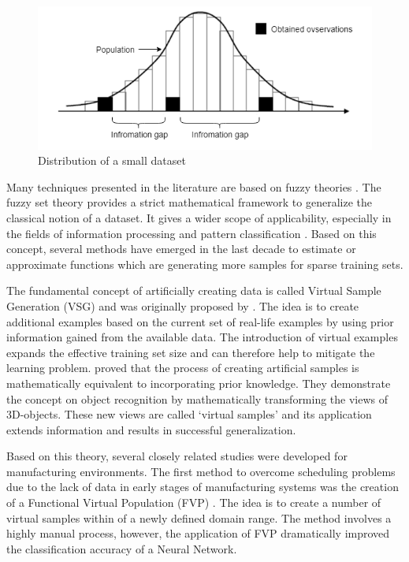 \documentclass[parskip=full]{scrartcl}
\begin{document}
\begin{figure}[H]
	\centering
	\includegraphics[width=0.6\linewidth]{"./resources/small_data_distribution"}
	\caption{Distribution of a small dataset \cite{Tsai.2015}}
	\label{fig:small-data-distribution}
\end{figure}

Many techniques presented in the literature are based on fuzzy theories
\cite{AbdulLateh.2017}. The fuzzy set theory provides a strict mathematical
framework to generalize the classical notion of a dataset. It gives a wider
scope of applicability, especially in the fields of information processing and
pattern classification \cite{Zimmermann.2010}. Based on this concept, several
methods have emerged in the last decade to estimate or approximate functions
which are generating more samples for sparse training sets.

The fundamental concept of artificially creating data is called Virtual Sample 
Generation (VSG) and was originally proposed by \cite{Niyogi.1998}. The idea is 
to create additional examples based on the current set of real-life examples by 
using prior information gained from the available data. The introduction of 
virtual examples expands the effective training set size and can therefore help 
to mitigate the learning problem. \cite{Niyogi.1998} proved that the process of 
creating artificial samples is mathematically equivalent to incorporating prior 
knowledge. They demonstrate the concept on object recognition by mathematically 
transforming the views of 3D-objects. These new views are called ‘virtual 
samples’ and its application extends information and results in successful 
generalization. 

Based on this theory, several closely related studies were developed for
manufacturing environments. The first method to overcome scheduling problems due
to the lack of data in early stages of manufacturing systems was the creation of
a Functional Virtual Population (FVP) \cite{Li.2003}. The idea is to
create a number of virtual samples within of a newly defined domain range. The
method involves a highly manual process, however, the application of FVP
dramatically improved the classification accuracy of a Neural Network. 
\end{document}
